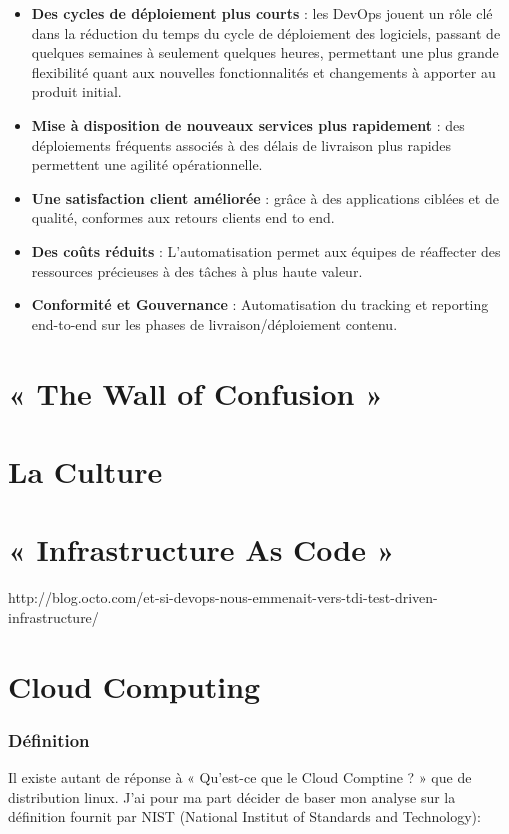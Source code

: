 \documentclass{report}
\begin{document}
  \begin{itemize}
    \item \textbf{Des cycles de déploiement plus courts} : les DevOps jouent un rôle clé dans la réduction du temps du cycle de déploiement des logiciels, passant de quelques semaines à seulement quelques heures, permettant une plus grande flexibilité quant aux nouvelles fonctionnalités et changements à apporter au produit initial.
    \item \textbf{Mise à disposition de nouveaux services plus rapidement} : des déploiements fréquents associés à des délais de livraison plus rapides permettent une agilité opérationnelle.
    \item \textbf{Une satisfaction client améliorée} : grâce à des applications ciblées et de qualité, conformes aux retours clients end to end.
    \item \textbf{Des coûts réduits} : L’automatisation permet aux équipes de réaffecter des ressources précieuses à des tâches à plus haute valeur.
    \item \textbf{Conformité et Gouvernance} : Automatisation du tracking et reporting end-to-end sur les phases de livraison/déploiement contenu.\\
  \end{itemize}

  \section{« The Wall of Confusion »}

  \section{La Culture}

  \section{« Infrastructure As Code »}

  http://blog.octo.com/et-si-devops-nous-emmenait-vers-tdi-test-driven-infrastructure/

  \section{Cloud Computing}

    \subsubsection{Définition}
    Il existe autant de réponse à « Qu’est-ce que le Cloud Comptine ? » que de distribution linux. J’ai pour ma part décider de baser mon analyse sur la définition fournit par NIST (National Institut of Standards and Technology):\\
\end{document}
